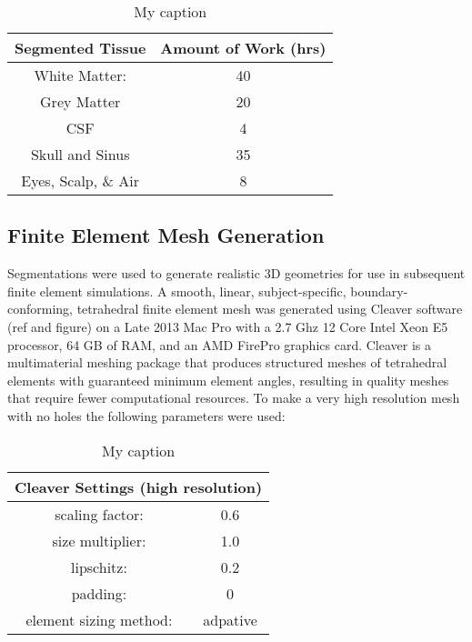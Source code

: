 \begin{table}[]
\centering
\caption{My caption}
\label{my-label}
\begin{tabular}{|c|c|}
\hline
Segmented Tissue    & Amount of Work (hrs) \\ \hline
White Matter:       & 40                   \\ \hline
Grey Matter         & 20                   \\ \hline
CSF                 & 4                    \\ \hline
Skull and Sinus     & 35                   \\ \hline
Eyes, Scalp, \& Air & 8                    \\ \hline
\end{tabular}
\end{table}

\subsection{Finite Element Mesh Generation}
\label{sec:mesh}


Segmentations were used to generate realistic 3D geometries for use in subsequent finite element simulations. A smooth, linear, subject-specific, boundary-conforming, tetrahedral finite element mesh was generated using Cleaver software (ref and figure) on a Late 2013 Mac Pro with a 2.7 Ghz 12 Core Intel Xeon E5 processor, 64 GB of RAM, and an AMD FirePro graphics card. Cleaver is a multimaterial meshing package that produces structured meshes of tetrahedral elements with guaranteed minimum element angles, resulting in quality meshes that require fewer computational resources. To make a very high resolution mesh with no holes the following parameters were used: 
\begin{table}[]
\centering
\caption{My caption}
\label{my-label}
\begin{tabular}{|c|c|}
\hline
\multicolumn{2}{|c|}{Cleaver Settings (high resolution)} \\ \hline
scaling factor:                    & 0.6                 \\ \hline
size multiplier:                   & 1.0                 \\ \hline
lipschitz:                         & 0.2                 \\ \hline
padding:                           & 0                   \\ \hline
element sizing method:             & adpative            \\ \hline
\end{tabular}
\end{table}

